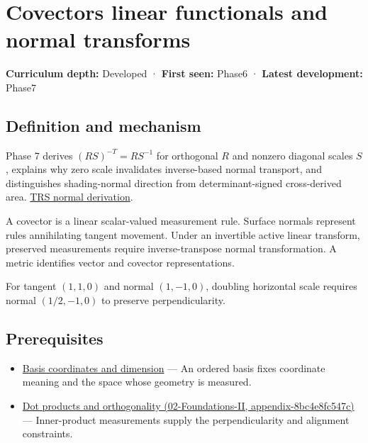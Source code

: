 \hypertarget{appendix-46da295c6787}{}
\section{Covectors linear functionals and normal transforms}\label{appendix-46da295c6787-covectors-linear-functionals-and-normal-transforms}

\textbf{Curriculum depth:} Developed · \textbf{First seen:} Phase6 · \textbf{Latest development:} Phase7

\subsection{Definition and mechanism}\label{appendix-46da295c6787-definition-and-mechanism}

Phase 7 derives \((RS)^{-T}=RS^{-1}\) for orthogonal \(R\) and nonzero diagonal scales \(S\), explains why zero scale invalidates inverse-based normal transport, and distinguishes shading-normal direction from determinant-signed cross-derived area. \hyperref[01-foundations-i-ch019-normals-undo-scale-before-following-rotation]{TRS normal derivation}.

A covector is a linear scalar-valued measurement rule. Surface normals represent rules annihilating tangent movement. Under an invertible active linear transform, preserved measurements require inverse-transpose normal transformation. A metric identifies vector and covector representations.

For tangent \((1,1,0)\) and normal \((1,-1,0)\), doubling horizontal scale requires normal \((1/2,-1,0)\) to preserve perpendicularity.

\subsection{Prerequisites}\label{appendix-46da295c6787-prerequisites}

\begin{itemize}
\tightlist
\item
  \hyperref[appendix-ce0341f7ea0d]{Basis coordinates and dimension} --- An ordered basis fixes coordinate meaning and the space whose geometry is measured.
\item
  \href{../02-Foundations-II/main.pdf\#nameddest=appendix-8bc4e8fc547c}{Dot products and orthogonality (02-Foundations-II, appendix-8bc4e8fc547c)} --- Inner-product measurements supply the perpendicularity and alignment constraints.
\end{itemize}

